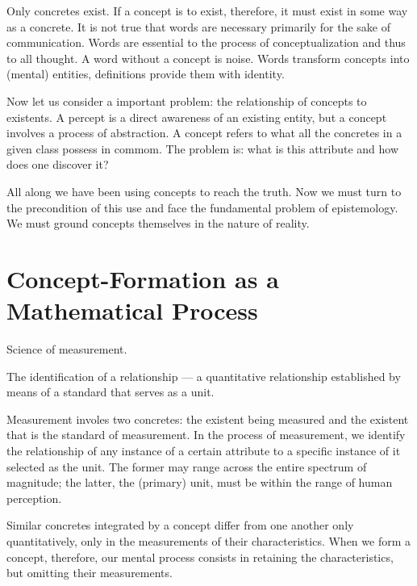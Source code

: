         Only concretes exist. If a concept is to exist, therefore, it must exist in some way as a concrete. It is not true that words are necessary primarily for the sake of communication. Words are essential to the process of conceptualization and thus to all thought. A word without a concept is noise. Words transform concepts into (mental) entities, definitions provide them with identity.

        Now let us consider a important problem: the relationship of concepts to existents. A percept is a direct awareness of an existing entity, but a concept involves a process of abstraction. A concept refers to what all the concretes in a given class possess in commom. The problem is: what is this attribute and how does one discover it?

        All along we have been using concepts to reach the truth. Now we must turn to the precondition of this use and face the fundamental problem of epistemology. We must ground concepts themselves in the nature of reality.

    \section{Concept-Formation as a Mathematical Process}

            \begin{definition}[Mathematics]
            \label{def:mathematics}
                Science of measurement.
            \end{definition}

            \begin{definition}[Measurement]
            \label{def:measurement}
                The identification of a relationship — a quantitative relationship established by means of a standard that serves as a unit.
            \end{definition}

        Measurement involes two concretes: the existent being measured and the existent that is the standard of measurement. In the process of measurement, we identify the relationship of any instance of a certain attribute to a specific instance of it selected as the unit. The former may range across the entire spectrum of magnitude; the latter, the (primary) unit, must be within the range of human perception.

        Similar concretes integrated by a concept differ from one another only quantitatively, only in the measurements of their characteristics. When we form a concept, therefore, our mental process consists in retaining the characteristics, but omitting their measurements. 
        
